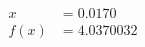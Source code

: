 \documentclass[preview]{standalone}
\begin{document}
\begin{align*}
x &= 0.0170\\f(x) &= 4.0370032
\end{align*}
\end{document}
